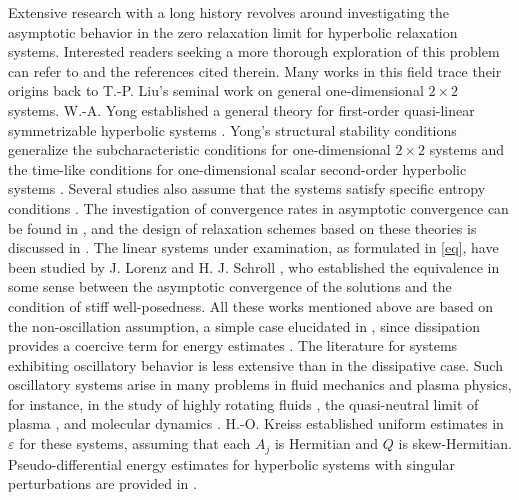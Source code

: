 \documentclass{article}
\theoremstyle{plain}%
\theoremstyle{definition}%
\theoremstyle{remark}%
\newcommand{\+}[1]{{\bm{#1}}}
\newcommand{\eps}{\varepsilon}
\begin{document}
Extensive research with a long history revolves around 
investigating the asymptotic behavior in the zero relaxation limit 
for hyperbolic relaxation systems. 
Interested readers seeking a more thorough exploration 
of this problem can refer to 
\cite{Natalini1999recent,Yong_singular_1999,Yong_basic_2002} and the 
references cited therein. 
Many works in this field trace their origins back to 
T.-P. Liu's seminal work \cite{Liu1987Hyperbolic} on general 
one-dimensional $2 \times 2$ systems. 
W.-A. Yong established a general theory for first-order quasi-linear 
symmetrizable hyperbolic systems 
\cite{Yong_singular_1992,Yong_singular_1999,Yong2001basic,
Yong_basic_2002}. 
Yong's structural stability conditions generalize the 
subcharacteristic conditions for one-dimensional $2 \times 2$ systems 
\cite{Liu1987Hyperbolic,Whitham1974linear} and the 
time-like conditions for one-dimensional scalar second-order 
hyperbolic systems \cite{deJager1975singular,Geel1978hyperbolic,
Schochet1987hyperbolic,vanHarten1985hyperbolic}. 
Several studies also assume that the systems satisfy specific 
entropy conditions \cite{Boillat1997hyperbolic,Chen1994hyperbolic,
Kawashima2004dissipative,Ruggeri2004stability,Tzavaras2005relative,
Yong2004entropy}. 
The investigation of convergence rates in asymptotic convergence can 
be found in \cite{Kurganov1997stiff,Teng1998first,Tveito1997rate},
and the design of relaxation schemes based on these  
theories is discussed in 
\cite{JinXin1995relaxation,Natalini1996Convergence}. 
The linear systems under examination, as formulated in \cref{eq}, 
have been studied by J. Lorenz and H. J. Schroll 
\cite{lorenz_stiff_1997,Lorenz1999Hyperbolic}, 
who established the equivalence in some sense between the 
asymptotic convergence of the solutions and the condition of 
stiff well-posedness. 
All these works mentioned above are based on the non-oscillation 
assumption, a simple case elucidated in \cite{Yong_basic_2002},
since dissipation provides a coercive term for energy estimates
\cite{Chern1995hyperbolic,Yong_singular_1999}. 
The literature for systems exhibiting oscillatory behavior is less  
extensive than in the dissipative case.
Such oscillatory systems arise in many problems in 
fluid mechanics and plasma physics, for instance, in the study of 
highly rotating fluids 
\cite{Babin1996global,Embid1996averaging,Fanelli2019Asymtptocs,
Feireisl2012Multiscale}, 
the quasi-neutral limit of plasma \cite{Grenier1996Oscillations}, 
and molecular dynamics 
\cite{Ascher1999oscillatory,Ebert1981Modelling}.
H.-O. Kreiss \cite{Kreiss1980problems} established uniform estimates 
in $\eps$ for these systems, assuming that each $A_j$ is Hermitian 
and $Q$ is skew-Hermitian. 
Pseudo-differential energy estimates for hyperbolic systems with 
singular perturbations are provided in \cite{Grenier1997Pseudo}.
\end{document}
